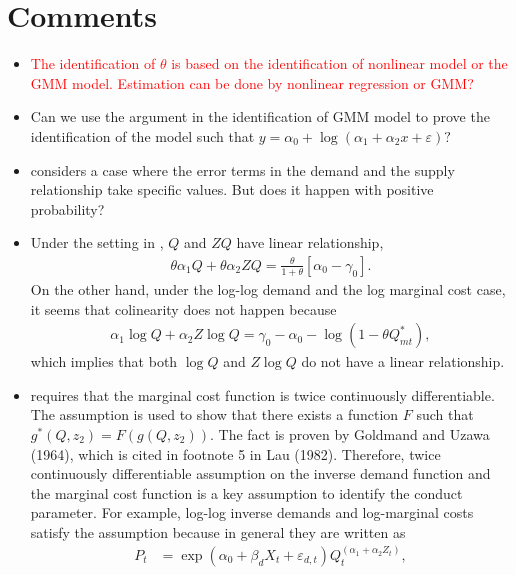\documentclass[11pt]{article}
\begin{document}
\section{Comments}
    \begin{itemize}
        \item \textcolor{red}{ The identification of $\theta$ is based on the identification of nonlinear model or the GMM model. Estimation can be done by nonlinear regression or GMM?}
        \item Can we use the argument in the identification of GMM model to prove the identification of the model such that  $y = \alpha_0 + \log(\alpha_1 + \alpha_2 x +\varepsilon)?$
        \item \cite{perloff2012collinearity} considers a case where the error terms in the demand and the supply relationship take specific values. But does it happen with positive probability?  
        \item Under the setting in \cite{perloff2012collinearity}, $Q$ and $ZQ$ have linear relationship, 
        \begin{align*}
            \theta \alpha_1 Q + \theta \alpha_2 ZQ = \frac{\theta}{1 + \theta} [\alpha_0 - \gamma_0].
        \end{align*}
        On the other hand, under the log-log demand and the log marginal cost case, it seems that colinearity does not happen because 
        \begin{align*}
            \alpha_1 \log Q + \alpha_2 Z\log Q = \gamma_0 - \alpha_0 -  \log \left(  1 - \theta Q^*_{mt} \right),
        \end{align*}
        which implies that both $\log Q$ and $Z\log Q$ do not have a linear relationship.
        \item \cite{lau1982identifying} requires that the marginal cost function is twice continuously differentiable. The assumption is used to show that there exists a function $F$ such that $g^*(Q,z_2) = F(g(Q,z_2))$. The fact is proven by Goldmand and Uzawa (1964), which is cited in footnote 5 in Lau (1982). Therefore, twice continuously differentiable assumption on the inverse demand function and the marginal cost function is a key assumption to identify the conduct parameter. For example, log-log inverse demands and log-marginal costs satisfy the assumption because in general they are written as 
        \begin{align*}
            P_t &= \exp(\alpha_0+\beta_d X_t + \varepsilon_{d,t})Q_t^{(\alpha_1 + \alpha_2 Z_t)},\\

\end{align*}
\end{itemize}
\end{document}
